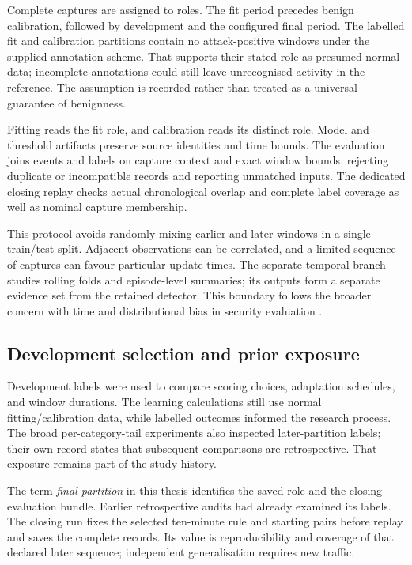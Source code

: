 Complete captures are assigned to roles. The fit period precedes benign
calibration, followed by development and the configured final period.
The labelled fit and calibration partitions contain no attack-positive
windows under the supplied annotation scheme. That supports their stated
role as presumed normal data; incomplete annotations could still leave
unrecognised activity in the reference. The assumption is recorded rather
than treated as a universal guarantee of benignness.

Fitting reads the fit role, and calibration reads its distinct role.
Model and threshold artifacts preserve source identities and time bounds.
The evaluation joins events and labels on capture context and exact
window bounds, rejecting duplicate or incompatible records and reporting
unmatched inputs. The dedicated closing replay checks actual chronological
overlap and complete label coverage as well as nominal capture membership.

This protocol avoids randomly mixing earlier and later windows in a
single train/test split. Adjacent observations can be correlated,
and a limited sequence of captures can favour particular update times.
The separate temporal branch studies rolling folds and episode-level
summaries; its outputs form a separate evidence set from the retained
detector. This boundary follows the broader concern with time and
distributional bias in security evaluation \cite{pendlebury2019}.

\subsection{Development selection and prior exposure}

Development labels were used to compare scoring choices, adaptation
schedules, and window durations. The learning calculations still use
normal fitting/calibration data, while labelled outcomes informed the
research process. The broad per-category-tail experiments also
inspected later-partition labels; their own record states that subsequent
comparisons are retrospective. That exposure remains part of the study
history.

The term \emph{final partition} in this thesis identifies the saved role
and the closing evaluation bundle. Earlier retrospective audits had already
examined its labels. The closing run fixes the selected ten-minute rule and
starting pairs before replay and saves the complete records. Its value is
reproducibility and coverage of that declared later sequence; independent
generalisation requires new traffic.

